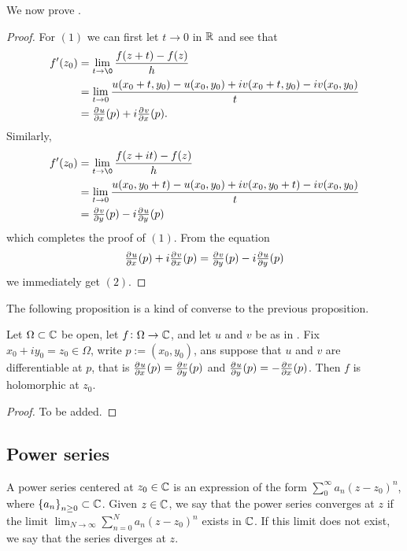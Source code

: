 \documentclass[11pt,a4paper]{article}
\begin{document}
We now prove .

\begin{proof}
  For $(1)$ we can first let $t \to 0$ in $\mathbb{R}$ and see that
  \begin{align*}
    f'(z_0) &= \lim_{t \to \0} \frac{f(z + t) - f(z)}{h} \\
            &= \lim_{t \to 0} \frac{u(x_0 + t, y_0) - u(x_0,y_0) + 
            i v(x_0 + t, y_0) - i v(x_0,y_0)}{t} \\
            &= \pd{u}{x}(p) + i \pd{v}{x}(p).
  \end{align*}
  Similarly,
  \begin{align*}
    f'(z_0) &= \lim_{t \to \0} \frac{f(z + i t) - f(z)}{h} \\
            &= \lim_{t \to 0} \frac{u(x_0, y_0 + t) - u(x_0,y_0) + 
            i v(x_0, y_0 + t) - i v(x_0,y_0)}{t} \\
            &= \pd{v}{y}(p) - i \pd{u}{y}(p)
  \end{align*}
  which completes the proof of $(1)$.
  From the equation
  \[
     \pd{u}{x}(p) + i \pd{v}{x}(p) = \pd{v}{y}(p) - i \pd{u}{y}(p)
  \]
  we immediately get $(2)$.
\end{proof}

The following proposition is a kind of converse to the previous proposition.

\begin{proposition}
  Let $\Omega \subset \mathbb{C}$ be open, let $f \colon \Omega \to \mathbb{C}$,
  and let $u$ and $v$ be as in .
  Fix $x_0 + i y_0 = z_0 \in \Omega$, write $p := (x_0,y_0)$,
  ans suppose that $u$ and $v$ are differentiable at $p$,
  that is $\pd{u}{x}(p) = \pd{v}{y}(p)$ and $\pd{u}{y}(p) = - \pd{v}{x}(p)$.
  Then $f$ is holomorphic at $z_0$.
\end{proposition}
\begin{proof}
  To be added.
\end{proof}

\subsection{Power series}

\begin{definition}
  A power series centered at $z_0 \in \mathbb{C}$ is an expression of the
  form $\sum_{0}^{\infty} a_n (z - z_0)^n$,
  where $\set{a_n}_{n \geq 0} \subset \mathbb{C}$.
  Given $z \in \mathbb{C}$, we say that the power series converges at $z$ if
  the limit $\lim_{N \to \infty} \sum_{n=0}^{N} a_n (z - z_0)^n$ exists
  in $\mathbb{C}$.
  If this limit does not exist, we say that the series diverges at $z$.
\end{definition}
\end{document}
